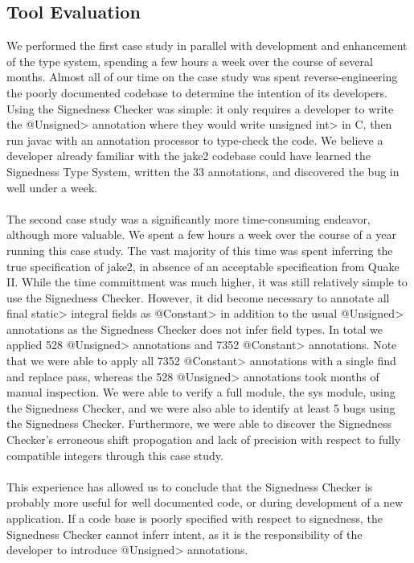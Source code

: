 \subsection{Tool Evaluation} \label{eval}
We performed the first case study in parallel with development and enhancement of
the type system, spending a few hours a week over the course of several months.
Almost all of our time on the case study
was spent reverse-engineering the poorly documented codebase to determine
the intention of its developers. Using
the Signedness Checker was simple:  it only requires a developer to
write the \<@Unsigned> annotation where they would write \<unsigned
int> in C,
then run javac with an annotation processor to type-check the code.
We believe a developer already familiar with the jake2 codebase could have
learned the Signedness Type System,
written the 33 annotations, and discovered the bug in well under a week.\\
\\
The second case study was a significantly more time-consuming endeavor, although
more valuable. We spent a few hours a week over the course of a year running
this case study. The vast majority of this time was spent inferring the true
specification of jake2, in absence of an acceptable specification from Quake II.
While the time committment was much higher, it was still relatively simple to
use the Signedness Checker. However, it did become necessary to annotate all
\<final static> integral fields as \<@Constant> in addition to the usual
\<@Unsigned> annotations as the Signedness Checker does not infer field types.
In total we applied 528 \<@Unsigned> annotations and 7352 \<@Constant>
annotations. Note that we were able to apply all 7352 \<@Constant> annotations
with a single find and replace pass, whereas the 528 \<@Unsigned> annotations
took months of manual inspection.
We were able to verify a full module, the sys module, using the
Signedness Checker, and we were also able to identify at least 5 bugs using
the Signedness Checker. Furthermore, we were able to discover the Signedness
Checker's erroneous shift propogation and lack of precision with respect to
fully compatible integers through this case study.\\
\\
This experience has allowed us to conclude that the Signedness Checker is
probably more useful for well documented code, or during development of a new
application. If a code base is poorly specified with respect to signedness,
the Signedness Checker cannot inferr intent, as it is the responsibility of the
developer to introduce \<@Unsigned> annotations.

